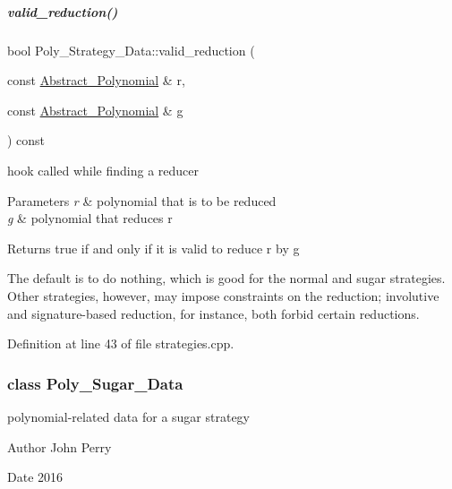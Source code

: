 \mbox{\label{group__strategygroup_a996754ff163b0ff32d783ec723ac35be}} 
\subparagraph{\texorpdfstring{valid\+\_\+reduction()}{valid\_reduction()}}
{\footnotesize\ttfamily bool Poly\+\_\+\+Strategy\+\_\+\+Data\+::valid\+\_\+reduction (\begin{DoxyParamCaption}\item[{const \hyperlink{group__polygroup_class_abstract___polynomial}{Abstract\+\_\+\+Polynomial} \&}]{r,  }\item[{const \hyperlink{group__polygroup_class_abstract___polynomial}{Abstract\+\_\+\+Polynomial} \&}]{g }\end{DoxyParamCaption}) const\hspace{0.3cm}{\ttfamily [virtual]}}



hook called while finding a reducer 


\begin{DoxyParams}{Parameters}
{\em r} & polynomial that is to be reduced \\
\hline
{\em g} & polynomial that reduces {\ttfamily r} \\
\hline
\end{DoxyParams}
\begin{DoxyReturn}{Returns}
{\ttfamily true} if and only if it is valid to reduce {\ttfamily r} by {\ttfamily g} 
\end{DoxyReturn}
The default is to do nothing, which is good for the normal and sugar strategies. Other strategies, however, may impose constraints on the reduction; involutive and signature-\/based reduction, for instance, both forbid certain reductions. 

Definition at line 43 of file strategies.\+cpp.

\label{class_poly___sugar___data}
\subsubsection{class Poly\+\_\+\+Sugar\+\_\+\+Data}
polynomial-\/related data for a sugar strategy 

\begin{DoxyAuthor}{Author}
John Perry 
\end{DoxyAuthor}
\begin{DoxyDate}{Date}
2016 
\end{DoxyDate}


